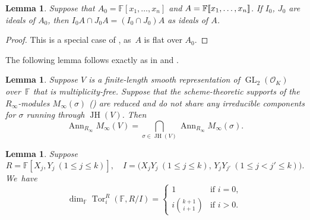 \documentclass[JEP,XML,SOM,Unicode,NoFloatCountersInSection, NoEqCountersInSection,published]{cedram}
\newcommand{\F}{\mathbb{F}}
\newcommand{\cO}{\mathcal{O}}
\newcommand{\bbra}[1]{[\mkern-3mu[#1]\mkern-3mu]}
\DeclareMathOperator{\Ann}{Ann}
\DeclareMathOperator{\GL}{GL}
\DeclareMathOperator{\JH}{\mathrm{JH}}
\DeclareMathOperator{\Tor}{Tor}
\theoremstyle{plain}
\newtheorem{lem}[prop]{Lemma}
\theoremstyle{definition}
\begin{document}
\begin{lem}\label{lem:intersec}
Suppose that $A_0 = \F[x_1,\dots,x_n]$ and $A = \F\bbra{x_1,\dots,x_n}$.
If $I_0$, $J_0$ are ideals of $A_0$, then $I_0 A \cap J_0 A = (I_0 \cap J_0)A$ as ideals of $A$.
\end{lem}

\begin{proof}
This is a special case of \cite[Th.\,7.4(ii)]{Ma}, as~$A$ is flat over $A_0$.
\end{proof}

The following lemma follows exactly as in \cite[Lem.\,3.6.2]{LLLM2} and \cite[Prop.\,8.1.1]{EGS}.

\begin{lem}\label{lem:Ann}
Suppose $V$ is a finite-length smooth representation of $\GL_2(\cO_K)$ over~$\F$ that is multiplicity-free.
Suppose that the scheme-theoretic supports of the $R_\infty$\nobreakdash-modules $M_\infty(\sigma)$ (\cf \cite[\S 2.6]{BHHMS4}) are reduced and do not share any irreducible components for $\sigma$ running through $\JH(V)$.\vspace*{-3pt}
Then
\begin{equation*}
\Ann_{R_\infty} M_\infty(V) = \bigcap_{\sigma \in \JH(V)} \Ann_{R_\infty} M_\infty(\sigma).
\end{equation*}
\end{lem}

\begin{lem}\label{lem:Tor_i-stanley-reisner}
Suppose\vspace*{-3pt}
\[
R = \F[X_j, Y_j\ (1 \le j \le k)], \quad I = \bigl(X_jY_j\ (1 \le j \le k),\, Y_j Y_{j'}\ (1 \le j < j' \le k)\bigr).
\]
We~have\vspace*{-3pt}
\begin{equation*}
\dim_\F \Tor_i^R(\F,R/I) =
\begin{cases}
1 & \text{if $i = 0$},\\
i \binom{k+1}{i+1} & \text{if $i > 0$}.
\end{cases}
\end{equation*}
\end{lem}
\end{document}
